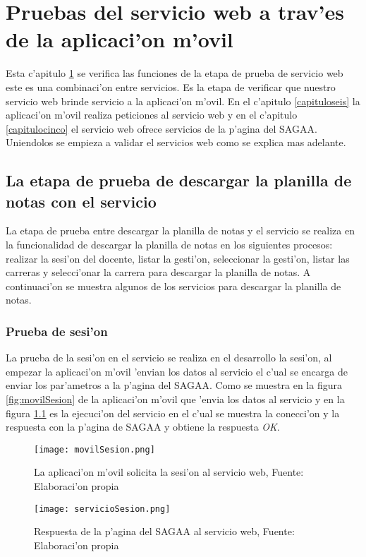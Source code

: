 \chapter{Pruebas del servicio web a trav'es de la aplicaci'on m'ovil} 
\label{capitulonueve}
Esta c'apitulo \ref{capitulonueve} se verifica las funciones de la etapa de prueba de servicio web este es una combinaci'on entre servicios. Es la etapa de verificar que nuestro servicio web brinde servicio a la aplicaci'on m'ovil. En el c'apitulo \ref{capituloseis} la aplicaci'on m'ovil realiza peticiones al servicio web y en el c'apitulo \ref{capitulocinco} el servicio web ofrece servicios de la p'agina del SAGAA. Uniendolos se empieza a validar el servicios web como se explica mas adelante.

\section{La etapa de prueba de descargar la planilla de notas con el servicio}
La etapa de prueba entre descargar la planilla de notas y el servicio se realiza en la funcionalidad de descargar la planilla de notas en los siguientes procesos: realizar la sesi'on del docente, listar la gesti'on, seleccionar la gesti'on, listar las carreras y selecci'onar la carrera para descargar la planilla de notas. A continuaci'on se muestra algunos de los servicios para descargar la planilla de notas.
\subsection{Prueba de sesi'on}
\label{Sesion}
La prueba de la sesi'on en el servicio se realiza en el 
desarrollo la sesi'on, al empezar la aplicaci'on m'ovil 'envian los datos al servicio el c'ual se encarga de enviar los par'ametros a la p'agina del SAGAA. Como se muestra en la figura \ref{fig:movilSesion} de la aplicaci'on m'ovil que 'envia los datos al servicio y en la figura \ref{fig:servicioSesion} es la ejecuci'on del servicio en el c'ual se muestra la conecci'on y la respuesta con la p'agina de SAGAA y obtiene la respuesta \textit{OK}. 
\begin{figure}[H]
\begin{minipage}{0.48\textwidth}
\centering
\texttt{[image: movilSesion.png]}
\caption{La aplicaci'on m'ovil solicita la sesi'on al servicio web, Fuente: Elaboraci'on propia}
\label{fig:movilSesion}
\end{minipage}\hfill
\begin {minipage}{0.48\textwidth}
\centering
\texttt{[image: servicioSesion.png]}
\caption{Respuesta de la p'agina del SAGAA al servicio web, Fuente: Elaboraci'on propia}
\label{fig:servicioSesion}
\end{minipage}
\end{figure}


